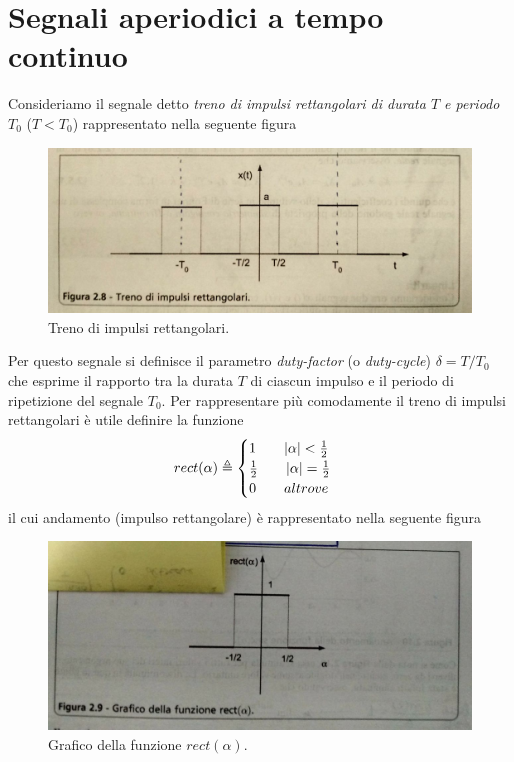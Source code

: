 \documentclass[12pt,oneside,openany]{memoir}
\numberwithin{equation}{subsection}
\DeclarePairedDelimiter{\abs}{\lvert}{\rvert}
\begin{document}
\section{Segnali aperiodici a tempo continuo}
Consideriamo il segnale detto \textit{treno di impulsi rettangolari di durata
$T$ e periodo $T_0$} ($T < T_0$) rappresentato nella seguente figura
\begin{figure}[H]
	\centering
	\captionsetup{justification=centering}
	\includegraphics[width=1.0\textwidth]{images/treno_di_impulsi_rettangolari.jpg}
	\caption{Treno di impulsi rettangolari.}
\end{figure}
Per questo segnale si definisce il parametro \textit{duty-factor} (o 
\textit{duty-cycle}) $\delta = T/T_0$ che esprime il rapporto tra la durata $T$
di ciascun impulso e il periodo di ripetizione del segnale $T_0$.
\bigbreak
Per rappresentare pi\`u comodamente il treno di impulsi rettangolari \`e utile
definire la funzione
\begin{equation}
	rect(\alpha) \triangleq
		\begin{cases}
			1 \quad\quad \abs{\alpha} < \frac{1}{2}\\
			\frac{1}{2} \quad\quad \abs{\alpha} = \frac{1}{2}\\
			0 \quad\quad altrove
		\end{cases}
\end{equation}
il cui andamento (impulso rettangolare) \`e rappresentato nella seguente figura
\begin{figure}[H]
	\centering
	\captionsetup{justification=centering}
	\includegraphics[width=1.0\textwidth]{images/rect_alpha.jpg}
	\caption{Grafico della funzione $rect(\alpha)$.}
\end{figure}
\end{document}
